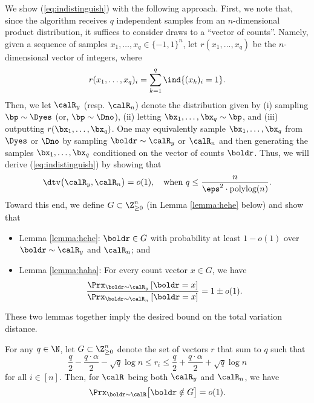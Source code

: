 We show (\ref{eq:indistinguish}) with the following approach. First, we note that, since the algorithm receives $q$ independent samples from an $n$-dimensional product distribution, it suffices to consider draws to a ``vector of counts''. Namely, given a sequence of samples $x_1, \dots, x_q \in \{-1,1\}^n$, let $r(x_1, \dots, x_q)$ be the $n$-dimensional vector of integers, where
\[ r(x_1,\dots, x_q)_i = \sum_{k=1}^q \ind\{ (x_k)_i = 1 \}. \]
Then, we let $\calR_y$ (resp. $\calR_n$) denote the distribution given by (i) sampling $\bp \sim \Dyes$ (or, $\bp \sim \Dno$), (ii) letting $\bx_1,\dots, \bx_q \sim \bp$, and (iii) outputting $r(\bx_1,\dots, \bx_q)$. One may equivalently sample $\bx_1,\dots, \bx_q$ from $\Dyes$ or $\Dno$ by sampling $\boldr \sim \calR_y$ or $\calR_n$ and then generating the samples $\bx_1,\dots, \bx_q$ conditioned on the vector of counts $\boldr$. Thus, we will derive (\ref{eq:indistinguish}) by showing that 
$$\dtv\big(\calR_y, \calR_n\big) = o(1),
\quad\text{when $q\le \frac{n}{\eps^2\cdot
\text{polylog}(n)}$}.$$ 
Toward this end, we define $G \subset \Z_{\geq 0}^n$ (in Lemma \ref{lemma:hehe} below) and show that
\begin{itemize}
    \item Lemma \ref{lemma:hehe}:
 $\boldr \in G$ with probability at least $1 - o(1)$ over $\boldr \sim \calR_y$ and $\calR_n$; and
 \item Lemma \ref{lemma:haha}: 
For every count vector $x \in G$, we have
\begin{align*}
\dfrac{\Prx_{\boldr \sim \calR_y}\left[ \boldr = x \right]}{\Prx_{\boldr \sim \calR_n}\left[ \boldr = x \right]} = 1 \pm o(1).
\end{align*}
\end{itemize}
These two lemmas together imply the desired bound on the total variation distance.

\begin{lemma}\label{lemma:hehe}
    For any $q \in \N$, let $G \subset \Z_{\geq 0}^n$ denote the set of vectors $r$ 
      that sum to $q$ such that 
    \[ \frac{q}{2} - \frac{q\cdot \alpha}{2} 
 - \sqrt{q} \log n \leq r_i \leq \frac{q}{2} + \frac{q\cdot \alpha}{2} 
 + \sqrt{q} \log n \]
 for all $i\in [n]$.
 Then, for $\calR$ being both $\calR_y$ and $\calR_n$, we have
    \begin{align*}
        \Prx_{\boldr \sim \calR}\big[ \boldr \notin G \big] = o(1).
    \end{align*}
\end{lemma}

